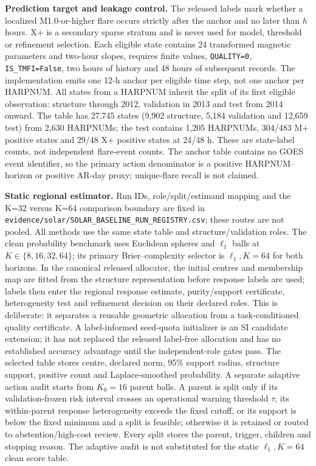 \documentclass[11pt,a4paper]{article}
\numberwithin{equation}{section}
\theoremstyle{definition}\newtheorem{definition}[theorem]{Definition}
\theoremstyle{remark}\newtheorem{remark}[theorem]{Remark}
\begin{document}
\textbf{Prediction target and leakage control.} The released labels mark whether a localized M1.0-or-higher flare occurs strictly after the anchor and no later than $h$ hours. X+ is a secondary sparse stratum and is never used for model, threshold or refinement selection. Each eligible state contains 24 transformed magnetic parameters and two-hour slopes, requires finite values, \texttt{QUALITY=0}, \texttt{IS\_TMFI=False}, two hours of history and 48 hours of subsequent records. The implementation emits one 12-h anchor per eligible time step, not one anchor per HARPNUM. All states from a HARPNUM inherit the split of its first eligible observation: structure through 2012, validation in 2013 and test from 2014 onward. The table has 27,745 states (9,902 structure, 5,184 validation and 12,659 test) from 2,630 HARPNUMs; the test contains 1,205 HARPNUMs, 304/483 M+ positive states and 29/48 X+ positive states at 24/48 h. These are state-label counts, not independent flare-event counts. The anchor table contains no GOES event identifier, so the primary action denominator is a positive HARPNUM--horizon or positive AR-day proxy; unique-flare recall is not claimed.

\textbf{Static regional estimator.} Run IDs, role/split/estimand mapping and the K=32 versus K=64 comparison boundary are fixed in \texttt{evidence/solar/SOLAR\_BASELINE\_RUN\_REGISTRY.csv}; these routes are not pooled. All methods use the same state table and structure/validation roles. The clean probability benchmark uses Euclidean spheres and $\ell_1$ balls at $K\in\{8,16,32,64\}$; its primary Brier--complexity selector is $\ell_1,K=64$ for both horizons. In the canonical released allocator, the initial centres and membership map are fitted from the structure representation before response labels are used; labels then enter the regional response estimate, purity/support certificate, heterogeneity test and refinement decision on their declared roles. This is deliberate: it separates a reusable geometric allocation from a task-conditioned quality certificate. A label-informed seed-quota initializer is an SI candidate extension; it has not replaced the released label-free allocation and has no established accuracy advantage until the independent-role gates pass. The selected table stores centre, declared norm, 95\% support radius, structure support, positive count and Laplace-smoothed probability. A separate adaptive action audit starts from $K_0=16$ parent balls. A parent is split only if its validation-frozen risk interval crosses an operational warning threshold $\tau$, its within-parent response heterogeneity exceeds the fixed cutoff, or its support is below the fixed minimum and a split is feasible; otherwise it is retained or routed to abstention/high-cost review. Every split stores the parent, trigger, children and stopping reason. The adaptive audit is not substituted for the static $\ell_1,K=64$ clean score table.
\end{document}
